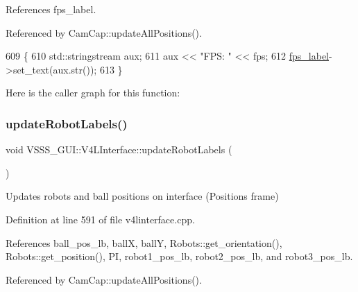 References fps\+\_\+label.



Referenced by Cam\+Cap\+::update\+All\+Positions().


\begin{DoxyCode}
609                                         \{
610         std::stringstream aux;
611         aux << \textcolor{stringliteral}{"FPS: "} << fps;
612         \hyperlink{class_v_s_s_s___g_u_i_1_1_v4_l_interface_a91de027bfa97cc197bb0574873051d1d}{fps\_label}->set\_text(aux.str());
613     \}
\end{DoxyCode}
Here is the caller graph for this function\+:
\mbox{\label{class_v_s_s_s___g_u_i_1_1_v4_l_interface_a32c034643a07b5354ad50541413ff08d}} 
\subsubsection{\texorpdfstring{update\+Robot\+Labels()}{updateRobotLabels()}}
{\footnotesize\ttfamily void V\+S\+S\+S\+\_\+\+G\+U\+I\+::\+V4\+L\+Interface\+::update\+Robot\+Labels (\begin{DoxyParamCaption}{ }\end{DoxyParamCaption})}



Updates robots and ball positions on interface (Positions frame) 



Definition at line 591 of file v4linterface.\+cpp.



References ball\+\_\+pos\+\_\+lb, ballX, ballY, Robots\+::get\+\_\+orientation(), Robots\+::get\+\_\+position(), PI, robot1\+\_\+pos\+\_\+lb, robot2\+\_\+pos\+\_\+lb, and robot3\+\_\+pos\+\_\+lb.



Referenced by Cam\+Cap\+::update\+All\+Positions().


